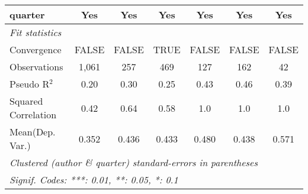 \begin{tabular}{lcccccc}
   quarter                                                    & Yes           & Yes           & Yes          & Yes             & Yes           & Yes\\  
   \midrule
   \emph{Fit statistics}\\
   Convergence                                                &FALSE          & FALSE         & TRUE         & FALSE           & FALSE         & FALSE\\  
   Observations                                               & 1,061         & 257           & 469          & 127             & 162           & 42\\  
   Pseudo R$^2$                                               & 0.20          & 0.30          & 0.25         & 0.43            & 0.46          & 0.39\\  
   Squared Correlation                                        & 0.42          & 0.64          & 0.58         & 1.0             & 1.0           & 1.0\\  
Mean(Dep. Var.) & 0.352 & 0.436 & 0.433 & 0.480 & 0.438 & 0.571 \\
   \midrule \midrule
   \multicolumn{7}{l}{\emph{Clustered (author \& quarter) standard-errors in parentheses}}\\
   \multicolumn{7}{l}{\emph{Signif. Codes: ***: 0.01, **: 0.05, *: 0.1}}\\
\end{tabular}
\par\endgroup
